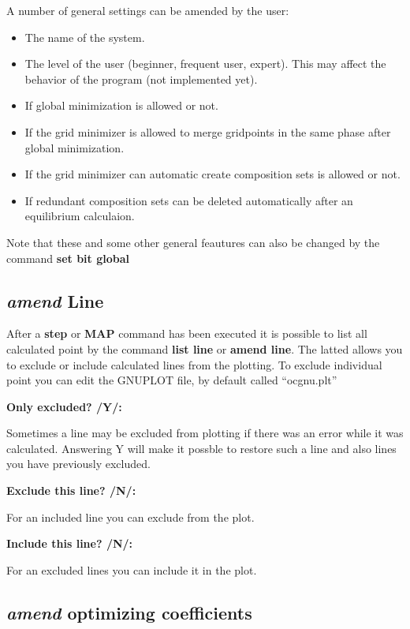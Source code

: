 \documentclass[11pt]{article}
\begin{document}
A number of general settings can be amended by the user:

\begin{itemize}
\item The name of the system.
\item The level of the user (beginner, frequent user, expert).  This
  may affect the behavior of the program (not implemented yet).
\item If global minimization is allowed or not.
\item If the grid minimizer is allowed to merge gridpoints in the same
  phase after global minimization.
\item If the grid minimizer can automatic create composition sets is
  allowed or not.
\item If redundant composition sets can be deleted automatically after
  an equilibrium calculaion.
\end{itemize}

Note that these and some other general feautures can also be changed
by the command {\bf set bit global}

\hypertarget{Amend line}{}
\subsection{{\em amend} Line}

After a {\bf step} or {\bf MAP} command has been executed it is
possible to list all calculated point by the command {\bf list line}
or {\bf amend line}.  The latted allows you to exclude or include
calculated lines from the plotting.  To exclude individual point you
can edit the GNUPLOT file, by default called ``ocgnu.plt''

{\bf Only excluded? /Y/:}

Sometimes a line may be excluded from plotting if there was an error
while it was calculated.  Answering Y will make it possble to restore
such a line and also lines you have previously excluded.

{\bf Exclude this line? /N/:}

For an included line you can exclude from the plot.

{\bf Include this line? /N/:}

For an excluded lines you can include it in the plot.

\hypertarget{Amend optim coeff}{}
\hypertarget{Amend optim coeffs}{}
\subsection{{\em amend} optimizing coefficients}
\end{document}
